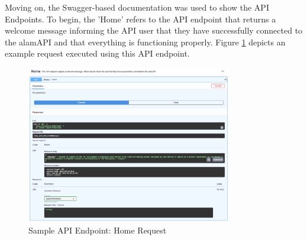 Moving on, the Swagger-based documentation was used to show the API Endpoints. To begin, the 
'Home' refers to the API endpoint that returns a welcome message informing the API user that they 
have successfully connected to the alamAPI and that everything is functioning properly. 
Figure \ref{fig:alamAPI_home} depicts 
an example request executed using this API endpoint.
\\
\begin{figure}[ht]
    \centering
    \includegraphics[width=0.80\textwidth]{./assets/Chapter_4/Documentation/alamAPI_home.png}
    \caption{Sample API Endpoint: Home Request}
    \label{fig:alamAPI_home}
\end{figure}
\FloatBarrier

